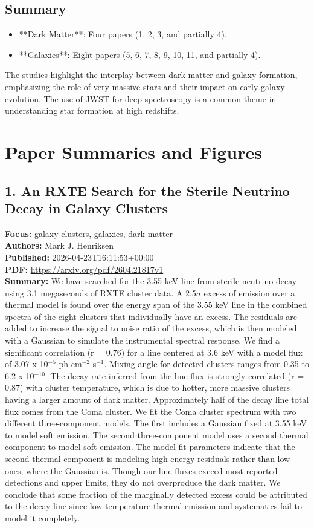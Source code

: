 \documentclass[11pt]{article}
\begin{document}
\subsection*{Summary}
\begin{itemize}
\item **Dark Matter**: Four papers (1, 2, 3, and partially 4).
\item **Galaxies**: Eight papers (5, 6, 7, 8, 9, 10, 11, and partially 4).
\end{itemize}
The studies highlight the interplay between dark matter and galaxy formation, emphasizing the role of very massive stars and their impact on early galaxy evolution. The use of JWST for deep spectroscopy is a common theme in understanding star formation at high redshifts.
\newpage
\section*{Paper Summaries and Figures}
\subsection*{1. An RXTE Search for the Sterile Neutrino Decay in Galaxy Clusters}
\textbf{Focus:} galaxy clusters, galaxies, dark matter\\
\textbf{Authors:} Mark J. Henriksen\\
\textbf{Published:} 2026-04-23T16:11:53+00:00\\
\textbf{PDF:} \href{https://arxiv.org/pdf/2604.21817v1}{https://arxiv.org/pdf/2604.21817v1}\\
\textbf{Summary:}
We have searched for the 3.55 keV line from sterile neutrino decay using 3.1 megaseconds of RXTE cluster data. A 2.5$\sigma $ excess of emission over a thermal model is found over the energy span of the 3.55 keV line in the combined spectra of the eight clusters that individually have an excess. The residuals are added to increase the signal to noise ratio of the excess, which is then modeled with a Gaussian to simulate the instrumental spectral response. We find a significant correlation (r = 0.76) for a line centered at 3.6 keV with a model flux of 3.07 x 10$^{-5}$ ph cm$^{-2}$ s$^{-1}$. Mixing angle for detected clusters ranges from 0.35 to 6.2 x 10$^{-10}$. The decay rate inferred from the line flux is strongly correlated (r = 0.87) with cluster temperature, which is due to hotter, more massive clusters having a larger amount of dark matter. Approximately half of the decay line total flux comes from the Coma cluster. We fit the Coma cluster spectrum with two different three-component models. The first includes a Gaussian fixed at 3.55 keV to model soft emission. The second three-component model uses a second thermal component to model soft emission. The model fit parameters indicate that the second thermal component is modeling high-energy residuals rather than low ones, where the Gaussian is. Though our line fluxes exceed most reported detections and upper limits, they do not overproduce the dark matter. We conclude that some fraction of the marginally detected excess could be attributed to the decay line since low-temperature thermal emission and systematics fail to model it completely.
\end{document}
